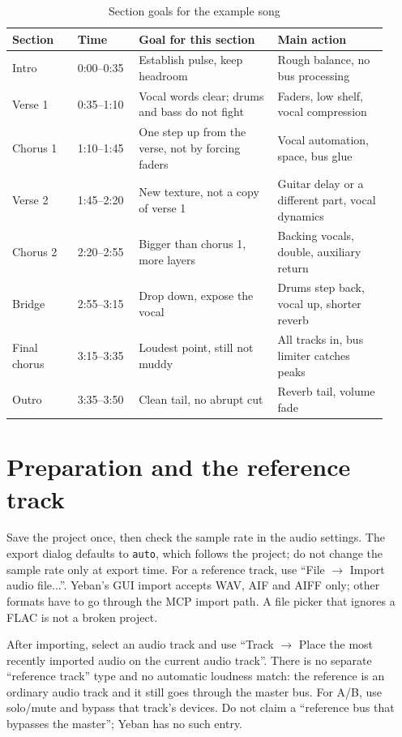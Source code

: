 \begin{table}[htbp]
\centering
\small
\begin{tabular}{@{}p{0.16\linewidth}p{0.15\linewidth}p{0.34\linewidth}p{0.27\linewidth}@{}}
\hline
Section & Time & Goal for this section & Main action \\
\hline
Intro & 0:00--0:35 & Establish pulse, keep headroom & Rough balance, no bus processing \\
Verse 1 & 0:35--1:10 & Vocal words clear; drums and bass do not fight & Faders, low shelf, vocal compression \\
Chorus 1 & 1:10--1:45 & One step up from the verse, not by forcing faders & Vocal automation, space, bus glue \\
Verse 2 & 1:45--2:20 & New texture, not a copy of verse 1 & Guitar delay or a different part, vocal dynamics \\
Chorus 2 & 2:20--2:55 & Bigger than chorus 1, more layers & Backing vocals, double, auxiliary return \\
Bridge & 2:55--3:15 & Drop down, expose the vocal & Drums step back, vocal up, shorter reverb \\
Final chorus & 3:15--3:35 & Loudest point, still not muddy & All tracks in, bus limiter catches peaks \\
Outro & 3:35--3:50 & Clean tail, no abrupt cut & Reverb tail, volume fade \\
\hline
\end{tabular}
\caption{Section goals for the example song}
\label{tab:walk-sections}
\end{table}

\section{Preparation and the reference track}

Save the project once, then check the sample rate in the audio settings. The export dialog defaults to \texttt{auto}, which follows the project; do not change the sample rate only at export time. For a reference track, use ``File $\rightarrow$ Import audio file...''. Yeban's GUI import accepts WAV, AIF and AIFF only; other formats have to go through the MCP import path. A file picker that ignores a FLAC is not a broken project.

After importing, select an audio track and use ``Track $\rightarrow$ Place the most recently imported audio on the current audio track''. There is no separate ``reference track'' type and no automatic loudness match: the reference is an ordinary audio track and it still goes through the master bus. For A/B, use solo/mute and bypass that track's devices. Do not claim a ``reference bus that bypasses the master''; Yeban has no such entry.

